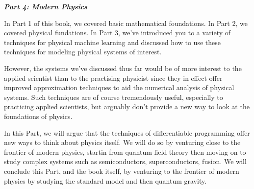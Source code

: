 \documentclass[book.tex]{subfiles}
\begin{document}
\pagestyle{empty}
\vspace*{36 pt}
\begin{center}\Huge\bfseries\itshape
Part 4: Modern Physics
\end{center}

In Part 1 of this book, we covered basic mathematical foundations. In Part 2, we covered physical fundations. In Part 3, we've introduced you to a variety of techniques for physical machine learning and discussed how to use these techniques for modeling physical systems of interest.

However, the systems we've discussed thus far would be of more interest to the applied scientist than to the practising physicist since they in effect offer improved approximation techniques to aid the numerical analysis of physical systems. Such techniques are of course tremendously useful, especially to practicing applied scientists, but arguably don't provide a new way to look at the foundations of physics.

In this Part, we will argue that the techniques of differentiable programming offer new ways to think about physics itself. We will do so by venturing close to the frontier of modern physics, startin from quantum field theory then moving on to study complex systems such as semiconductors, superconductors, fusion. We will conclude this Part, and the book itself, by venturing to the frontier of modern physics by studying the standard model and then quantum gravity.




%
%



\end{document}
